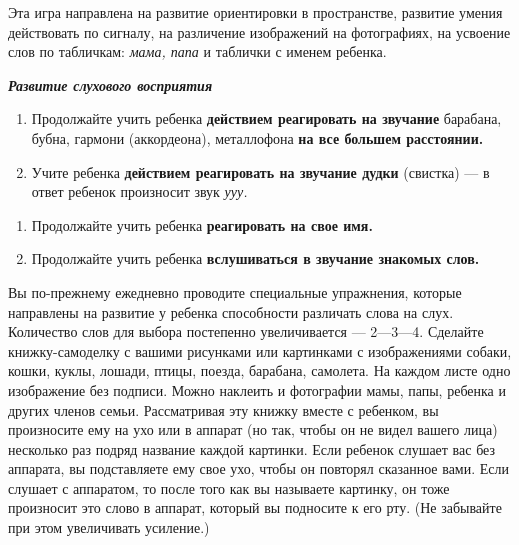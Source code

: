 \documentclass[a5paper]{book}
\renewcommand{\emph}[1]{\textit{#1}}
\begin{document}
Эта игра направлена на развитие ориентировки в пространстве, развитие
умения действовать по сигналу, на различение изображений на фотографиях,
на усвоение слов по табличкам: \emph{мама, папа} и таблички с именем
ребенка.

\emph{\textbf{Развитие слухового восприятия}}


\begin{enumerate}
\def\labelenumi{\arabic{enumi}.}
\item
  
  Продолжайте учить ребенка \textbf{действием реагировать на звучание}
  барабана, бубна, гармони (аккордеона), металлофона \textbf{на все
  большем расстоянии.}
  
\item
  
  Учите ребенка \textbf{действием реагировать на звучание дудки}
  (свистка) --- в ответ ребенок произносит звук \emph{ууу.}
  
\end{enumerate}

\begin{enumerate}
\def\labelenumi{\arabic{enumi}.}
\setcounter{enumi}{2}
\item
  
  Продолжайте учить ребенка \textbf{реагировать на свое имя.}
  
\item
  
  Продолжайте учить ребенка \textbf{вслушиваться в звучание знакомых
  слов.}
  
\end{enumerate}


Вы по-прежнему ежедневно проводите специальные упражнения, которые
направлены на развитие у ребенка способности различать слова на слух.
Количество слов для выбора постепенно увеличивается --- 2---3---4.
Сделайте книжку-самоделку с вашими рисунками или картинками с
изображениями собаки, кошки, куклы, лошади, птицы, поезда, барабана,
самолета. На каждом листе одно изображение без подписи. Можно наклеить и
фотографии мамы, папы, ребенка и других членов семьи. Рассматривая эту
книжку вместе с ребенком, вы произносите ему на ухо или в аппарат (но
так, чтобы он не видел вашего лица) несколько раз подряд название каждой
картинки. Если ребенок слушает вас без аппарата, вы подставляете ему
свое ухо, чтобы он повторял сказанное вами. Если слушает с аппаратом, то
после того как вы называете картинку, он тоже произносит это слово в
аппарат, который вы подносите к его рту. (Не забывайте при этом
увеличивать усиление.)
\end{document}

